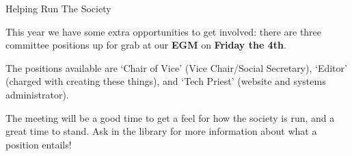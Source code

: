 \vspace{2mm} {\Large Helping Run The Society}

This year we have some extra opportunities to get involved: there are three
committee positions up for grab at our \textbf{EGM} on \textbf{Friday the 4th}.

The positions available are `Chair of Vice' (Vice Chair/Social Secretary),
`Editor' (charged with creating these things), and `Tech Priest' (website
and systems administrator).

The meeting will be a good time to get a feel for how the society is run,
and a great time to stand. Ask in the library for more information about
what a position entails!
